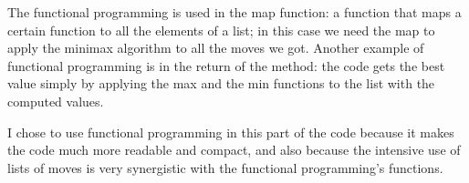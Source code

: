 \documentclass[english]{article}
\begin{document}
The functional programming is used in the map function: a function that maps a certain function to all the elements of a list; in this case we need the map to apply the minimax algorithm to all the moves we got.
Another example of functional programming is in the return of the method: the code gets the best value simply by applying the max and the min functions to the list with the computed values.

I chose to use functional programming in this part of the code because it makes the code much more readable and compact, and also because the intensive use of lists of moves is very synergistic with the functional programming's functions.
\end{document}

